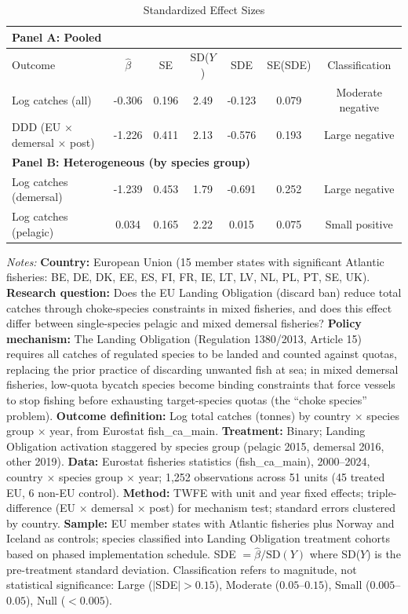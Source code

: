 \begin{table}[htbp]
\centering
\caption{Standardized Effect Sizes}
\label{tab:sde}
\small
\begin{tabular}{lcccccc}
\hline\hline
\multicolumn{7}{l}{\textbf{Panel A: Pooled}} \\
\hline
Outcome & $\hat{\beta}$ & SE & SD($Y$) & SDE & SE(SDE) & Classification \\
\hline
Log catches (all) & -0.306 & 0.196 & 2.49 & -0.123 & 0.079 & Moderate negative \\
DDD (EU $\times$ demersal $\times$ post) & -1.226 & 0.411 & 2.13 & -0.576 & 0.193 & Large negative \\
\hline
\multicolumn{7}{l}{\textbf{Panel B: Heterogeneous (by species group)}} \\
\hline
Log catches (demersal) & -1.239 & 0.453 & 1.79 & -0.691 & 0.252 & Large negative \\
Log catches (pelagic) & 0.034 & 0.165 & 2.22 & 0.015 & 0.075 & Small positive \\
\hline\hline
\end{tabular}
\begin{tablenotes}[flushleft]
\footnotesize
\item \textit{Notes:} \textbf{Country:} European Union (15 member states with significant Atlantic fisheries: BE, DE, DK, EE, ES, FI, FR, IE, LT, LV, NL, PL, PT, SE, UK). \textbf{Research question:} Does the EU Landing Obligation (discard ban) reduce total catches through choke-species constraints in mixed fisheries, and does this effect differ between single-species pelagic and mixed demersal fisheries? \textbf{Policy mechanism:} The Landing Obligation (Regulation 1380/2013, Article 15) requires all catches of regulated species to be landed and counted against quotas, replacing the prior practice of discarding unwanted fish at sea; in mixed demersal fisheries, low-quota bycatch species become binding constraints that force vessels to stop fishing before exhausting target-species quotas (the ``choke species'' problem). \textbf{Outcome definition:} Log total catches (tonnes) by country $\times$ species group $\times$ year, from Eurostat fish\_ca\_main. \textbf{Treatment:} Binary; Landing Obligation activation staggered by species group (pelagic 2015, demersal 2016, other 2019). \textbf{Data:} Eurostat fisheries statistics (fish\_ca\_main), 2000--2024, country $\times$ species group $\times$ year; 1,252 observations across 51 units (45 treated EU, 6 non-EU control). \textbf{Method:} TWFE with unit and year fixed effects; triple-difference (EU $\times$ demersal $\times$ post) for mechanism test; standard errors clustered by country. \textbf{Sample:} EU member states with Atlantic fisheries plus Norway and Iceland as controls; species classified into Landing Obligation treatment cohorts based on phased implementation schedule. SDE $= \hat{\beta} / \text{SD}(Y)$ where SD($Y$) is the pre-treatment standard deviation. Classification refers to magnitude, not statistical significance: Large ($|$SDE$| > 0.15$), Moderate ($0.05$--$0.15$), Small ($0.005$--$0.05$), Null ($< 0.005$). 
\end{tablenotes}
\end{table}
